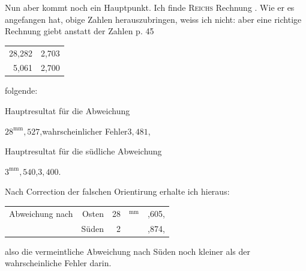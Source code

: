 Nun aber kommt noch ein Hauptpunkt. Ich finde \textsc{Reichs} Rechnung
. Wie er es angefangen hat, obige Zahlen herauszubringen, weiss ich
nicht: aber eine richtige Rechnung giebt anstatt der Zahlen p. 45
\begin{center}
\begin{tabular}{rr}
28,282 & 2,703\\
5,061 & 2,700
\end{tabular}
\end{center}
\noindent folgende:
\par\smallskip\noindent\hspace*{\parindent}Hauptresultat für die  Abweichung
\begin{center}
\(28^{\mathrm{mm}}{,}527\),\quad wahrscheinlicher Fehler\quad \(3{,}481\),
\end{center}
\noindent\hspace*{\parindent}Hauptresultat für die südliche Abweichung
\begin{center}
\(3^{\mathrm{mm}}{,}540\),\quad \(3{,}400\).
\end{center}
\clearpage{}
\noindent Nach Correction der falschen Orientirung erhalte ich hieraus:
\begin{center}
\begin{tabular}{@{}lr@{\,}r@{}l@{}l@{}}
Abweichung nach & Osten & 28 & \({}^{\mathrm{mm}}\) & ,605,\\
 & Süden & 2 & \(\phantom{{}^{\mathrm{mm}}}\) & ,874,
\end{tabular}
\end{center}
\noindent also die vermeintliche Abweichung nach Süden noch kleiner als der wahrscheinliche
Fehler darin.


